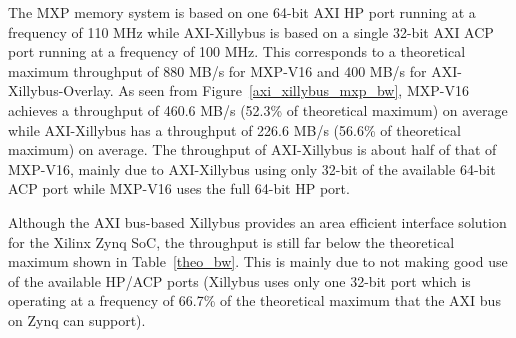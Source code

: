 The MXP memory system is based on one 64-bit AXI HP port running at a frequency of 110 MHz while AXI-Xillybus is based on a single 32-bit AXI ACP port running at a frequency of 100 MHz. 
This corresponds to a theoretical maximum throughput of 880 MB/s for MXP-V16 and 400 MB/s for AXI-Xillybus-Overlay. 
As seen from Figure~\ref{axi_xillybus_mxp_bw}, MXP-V16 achieves a throughput of 460.6 MB/s (52.3\% of theoretical maximum) on average while AXI-Xillybus has a throughput of 226.6 MB/s (56.6\% of theoretical maximum) on average. 
The throughput of AXI-Xillybus is about half of that of MXP-V16, mainly due to AXI-Xillybus using only 32-bit of the available 64-bit ACP port while MXP-V16 uses the full 64-bit HP port. 


\begin{table}[tb]
	\caption{Area overhead of AXI bus-based systems.}
	\label{xillybus_mxp_area}
	\centering
\end{table}

Although the AXI bus-based Xillybus provides an area efficient interface solution for the Xilinx Zynq SoC, the throughput is still far below the theoretical maximum shown in Table~\ref{theo_bw}. 
This is mainly due to not making good use of the available HP/ACP ports (Xillybus uses only one 32-bit port which is operating at a frequency of 66.7\% of the theoretical maximum that the AXI bus on Zynq can support). 



